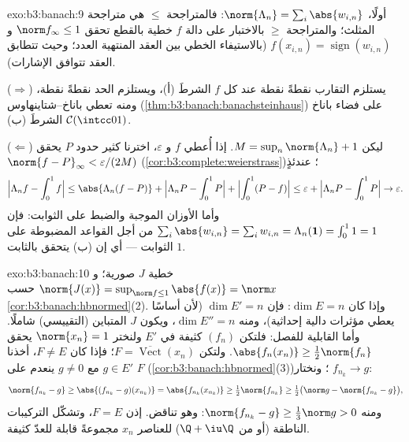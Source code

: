 \begin{solution}{exo:b3:banach:9}
أولًا، $\norm{\Lambda_n} = \sum_i\abs{w_{i,n}}$: فالمتراجحة $\leq$ هي متراجحة المثلث؛ والمتراجحة
$\geq$ بالاختبار على دالة $f$ خطية بالقطع تحقق $\norm f_\infty \leq 1$ و $f(x_{i,n}) =
\operatorname{sign}(w_{i,n})$
(بالاستيفاء الخطي بين العقد المنتهية العدد؛ وحيث تتطابق العقد
تتوافق الإشارات).

($\Rightarrow$) يستلزم التقارب نقطةً نقطة عند كل $f$ الشرطَ
(أ)، ويستلزم الحد نقطةً نقطة، ومنه تعطي باناخ--شتاينهاوس
(\cref{thm:b3:banach:banachsteinhaus}) على فضاء باناخ $\mathcal
C(\intcc01)$ الشرطَ (ب).

($\Leftarrow$) ليكن $M = \sup_n\norm{\Lambda_n} + 1$. إذا أُعطي $f$ و $\varepsilon$،
اخترنا كثير حدود $P$ يحقق $\norm{f -
P}_\infty < \varepsilon/(2M)$ (\cref{cor:b3:complete:weierstrass})؛ عندئذٍ
\[
\Bigl|\Lambda_n f - \int_0^1 f\Bigr|
\leq \abs{\Lambda_n(f - P)} + \Bigl|\Lambda_nP -
\int_0^1P\Bigr| + \Bigl|\int_0^1(P - f)\Bigr|
\leq \varepsilon + \Bigl|\Lambda_nP - \int_0^1P\Bigr| \to
\varepsilon .
\]
وأما الأوزان الموجبة والضبط على الثوابت: فإن $\sum_i\abs{w_{i,n}}
= \sum_iw_{i,n} = \Lambda_n(\mathbf 1) = \int_0^1 1 = 1$ من أجل
القواعد المضبوطة على الثوابت --- أي إن (ب) يتحقق بالثابت $1$.
\end{solution}

\begin{solution}{exo:b3:banach:10}
خطية $J$ صورية؛ و $\norm{J(x)} = \sup_{\norm f \leq
1}\abs{f(x)} = \norm x$ حسب \cref{cor:b3:banach:hbnormed}(2). وإذا كان
$\dim E = n$: فإن $\dim E' =
n$ (لأن أساسًا يعطي مؤثرات دالية
إحداثية)، ومنه $\dim E'' = n$، ويكون $J$ المتباين (التقييسي)
شاملًا. وأما القابلية للفصل: فلتكن $(f_n)$ كثيفة في $E'$
ولنختر $\norm{x_n} = 1$ يحقق $\abs{f_n(x_n)} \geq \frac12\norm{f_n}$. ولتكن $F =
\overline{\operatorname{Vect}}(x_n)$؛ فإذا كان
$F \neq E$، أخذنا $g
\in E'$ مع $g \neq 0$ ينعدم على $F$
(\cref{cor:b3:banach:hbnormed}(3))؛ ونختار $f_{n_k} \to g$:
\[
\norm{f_{n_k} - g} \geq \abs{(f_{n_k} - g)(x_{n_k})}
= \abs{f_{n_k}(x_{n_k})} \geq \tfrac12\norm{f_{n_k}}
\geq \tfrac12\bigl(\norm g - \norm{f_{n_k} - g}\bigr),
\]
ومنه $\norm{f_{n_k} - g} \geq \frac13\norm g > 0$: وهو تناقض. إذن $F = E$، وتشكّل التركيبات الناطقة
(أو من $\Q + \iu\Q$) للعناصر $x_n$ مجموعةً قابلة للعدّ كثيفة.
\end{solution}

